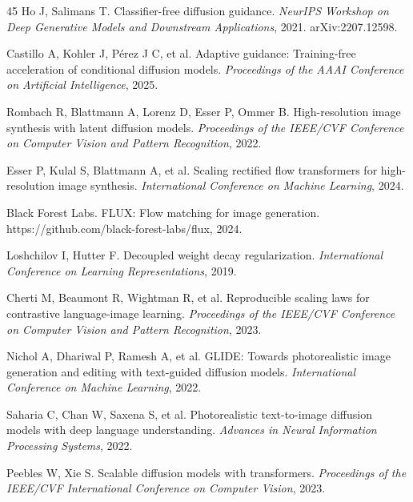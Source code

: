 \documentclass[times,twocolumn,final]{elsarticle}
\providecommand{\DIFdel}[1]{{\protect\color{red} \scriptsize #1}} %
\providecommand{\DIFdelbegin}{} %
\begin{document}
\begin{thebibliography}{45}
Ho J, Salimans T. Classifier-free diffusion guidance. \textit{NeurIPS Workshop on Deep Generative Models and Downstream Applications}, 2021. arXiv:2207.12598.

Castillo A, Kohler J, P\'erez J C, et al. Adaptive guidance: Training-free acceleration of conditional diffusion models. \textit{Proceedings of the AAAI Conference on Artificial Intelligence}, 2025.

\DIFdelbegin %
\DIFdel{Rombach R, Blattmann A, Lorenz D, Esser P, Ommer B. High-resolution image synthesis with latent diffusion models. \textit{Proceedings of the IEEE/CVF Conference on Computer Vision and Pattern Recognition}, 2022.
}%

\DIFdel{Esser P, Kulal S, Blattmann A, et al. Scaling rectified flow transformers for high-resolution image synthesis. \textit{International Conference on Machine Learning}, 2024.
}%

\DIFdel{Black Forest Labs. FLUX: Flow matching for image generation. https://github.com/black-forest-labs/flux, 2024.
}%

\DIFdel{Loshchilov I, Hutter F. Decoupled weight decay regularization. \textit{International Conference on Learning Representations}, 2019.
}%

\DIFdel{Cherti M, Beaumont R, Wightman R, et al. Reproducible scaling laws for contrastive language-image learning. \textit{Proceedings of the IEEE/CVF Conference on Computer Vision and Pattern Recognition}, 2023.
}%

\DIFdel{Nichol A, Dhariwal P, Ramesh A, et al. GLIDE: Towards photorealistic image generation and editing with text-guided diffusion models. \textit{International Conference on Machine Learning}, 2022.
}%

\DIFdel{Saharia C, Chan W, Saxena S, et al. Photorealistic text-to-image diffusion models with deep language understanding. \textit{Advances in Neural Information Processing Systems}, 2022.
}%

\DIFdel{Peebles W, Xie S. Scalable diffusion models with transformers. \textit{Proceedings of the IEEE/CVF International Conference on Computer Vision}, 2023.
}%


\end{thebibliography}
\end{document}
